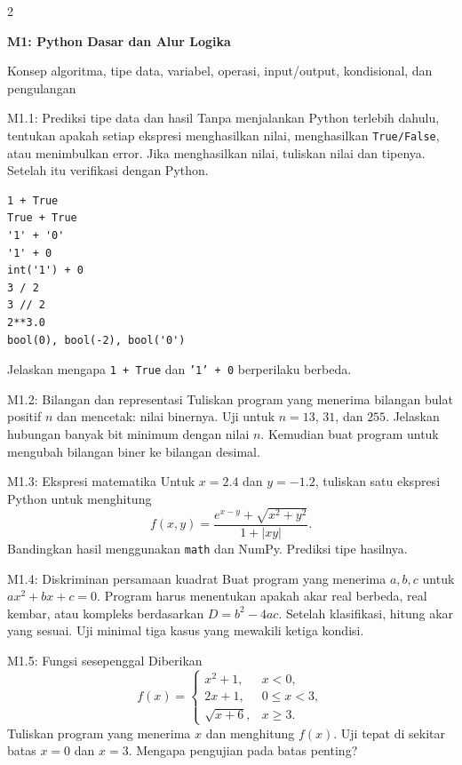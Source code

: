 \documentclass[9pt,a4paper]{article}
\newcommand{\bab}[2]{%
  \vspace{2pt}
  {\color{iteraBlue}\Large\bfseries #1}\par
  {\color{darkgray}\small #2}\par\vspace{3pt}
}
\begin{document}
\begin{multicols}{2}

\bab{M1: Python Dasar dan Alur Logika}{Konsep algoritma, tipe data, variabel, operasi, input/output, kondisional, dan pengulangan}

\begin{qbox}[L1]{M1.1: Prediksi tipe data dan hasil}
Tanpa menjalankan Python terlebih dahulu, tentukan apakah setiap ekspresi menghasilkan nilai, menghasilkan \texttt{True/False}, atau menimbulkan error. Jika menghasilkan nilai, tuliskan nilai dan tipenya. Setelah itu verifikasi dengan Python.
\begin{lstlisting}
1 + True
True + True
'1' + '0'
'1' + 0
int('1') + 0
3 / 2
3 // 2
2**3.0
bool(0), bool(-2), bool('0')
\end{lstlisting}
Jelaskan mengapa \texttt{1 + True} dan \texttt{'1' + 0} berperilaku berbeda.
\end{qbox}

\begin{qbox}[L1]{M1.2: Bilangan dan representasi}
Tuliskan program yang menerima bilangan bulat positif $n$ dan mencetak: nilai binernya. Uji untuk $n=13$, $31$, dan $255$. Jelaskan hubungan banyak bit minimum dengan nilai $n$. Kemudian buat program untuk mengubah bilangan biner ke bilangan desimal.
\end{qbox}

\begin{qbox}[L2]{M1.3: Ekspresi matematika}
Untuk $x=2.4$ dan $y=-1.2$, tuliskan satu ekspresi Python untuk menghitung
\[
f(x,y)=\frac{e^{x-y}+\sqrt{x^2+y^2}}{1+|xy|}.
\]
Bandingkan hasil menggunakan \texttt{math} dan NumPy. Prediksi tipe hasilnya.
\end{qbox}

\begin{qbox}[L2]{M1.4: Diskriminan persamaan kuadrat}
Buat program yang menerima $a,b,c$ untuk $ax^2+bx+c=0$. Program harus menentukan apakah akar real berbeda, real kembar, atau kompleks berdasarkan $D=b^2-4ac$. Setelah klasifikasi, hitung akar yang sesuai. Uji minimal tiga kasus yang mewakili ketiga kondisi.
\end{qbox}

\begin{qbox}[L2]{M1.5: Fungsi sesepenggal}
Diberikan
\[
f(x)=\begin{cases}
x^2+1,&x<0,\\
2x+1,&0\le x<3,\\
\sqrt{x+6},&x\ge 3.
\end{cases}
\]
Tuliskan program yang menerima $x$ dan menghitung $f(x)$. Uji tepat di sekitar batas $x=0$ dan $x=3$. Mengapa pengujian pada batas penting?
\end{qbox}


\end{multicols}
\end{document}
